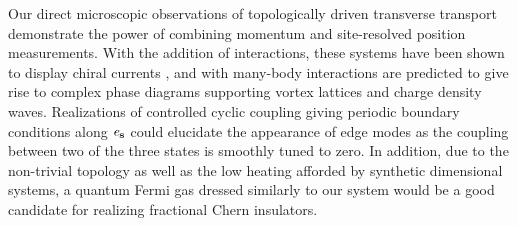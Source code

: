 Our direct microscopic observations of topologically driven transverse transport demonstrate the power of combining momentum and site-resolved position measurements. With the addition of interactions, these systems have been shown to display chiral currents \cite{Tai2017}, and with many-body interactions are predicted to give rise to complex phase diagrams supporting vortex lattices and charge density waves\cite{Greschner2015,Greschner2016,CalvaneseStrinati2017}. Realizations of controlled cyclic coupling giving periodic boundary conditions\cite{Celi2014} along $\bf{\mathit{e}_s}$ could elucidate the appearance of edge modes as the coupling between two of the three states is smoothly tuned to zero. In addition, due to the non-trivial topology as well as the low heating afforded by synthetic dimensional systems, a quantum Fermi gas dressed similarly to our system would be a good candidate for realizing fractional Chern insulators\cite{Parameswaran2013}.  

